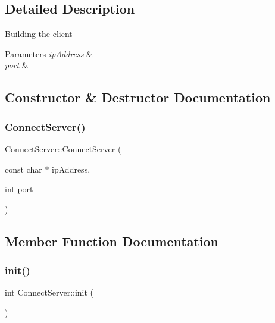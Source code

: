 \subsection{Detailed Description}
Building the client 
\begin{DoxyParams}{Parameters}
{\em ip\+Address} & \\
\hline
{\em port} & \\
\hline
\end{DoxyParams}


\subsection{Constructor \& Destructor Documentation}
\mbox{\label{class_connect_server_afe4d34d8bb8bbefa91a8429643d5425f}} 
\subsubsection{\texorpdfstring{Connect\+Server()}{ConnectServer()}}
{\footnotesize\ttfamily Connect\+Server\+::\+Connect\+Server (\begin{DoxyParamCaption}\item[{const char $\ast$}]{ip\+Address,  }\item[{int}]{port }\end{DoxyParamCaption})\hspace{0.3cm}{\ttfamily [inline]}}



\subsection{Member Function Documentation}
\mbox{\label{class_connect_server_ac98881bc8b73d8807841dd930b19d1d4}} 
\subsubsection{\texorpdfstring{init()}{init()}}
{\footnotesize\ttfamily int Connect\+Server\+::init (\begin{DoxyParamCaption}{ }\end{DoxyParamCaption})}



